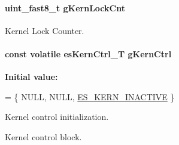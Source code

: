 \hypertarget{group__kern__impl_ga16a909b2eabeabadcfd3c8cd38437984}{
\paragraph[{g\-Kern\-Lock\-Cnt}]{\setlength{\rightskip}{0pt plus 5cm}uint\-\_\-fast8\-\_\-t g\-Kern\-Lock\-Cnt\hspace{0.3cm}{\ttfamily [static]}}}\label{group__kern__impl_ga16a909b2eabeabadcfd3c8cd38437984}


Kernel Lock Counter. 

\hypertarget{group__kern__impl_ga299ac766f155bf1ef931627e2a0b895b}{
\paragraph[{g\-Kern\-Ctrl}]{\setlength{\rightskip}{0pt plus 5cm}const volatile {\bf es\-Kern\-Ctrl\-\_\-\-T} g\-Kern\-Ctrl}}\label{group__kern__impl_ga299ac766f155bf1ef931627e2a0b895b}
{\bfseries Initial value\-:}
\begin{DoxyCode}
= \{
    NULL,                                                                       
    NULL,                                                                       
    \hyperlink{group__kern__intf_ggac9be6bfeddbd6af148cdb3867fbc24afa089165cac55f315953335f5ffe41b7c4}{ES\_KERN\_INACTIVE}                                                            
\}
\end{DoxyCode}


Kernel control initialization. 

Kernel control block. 